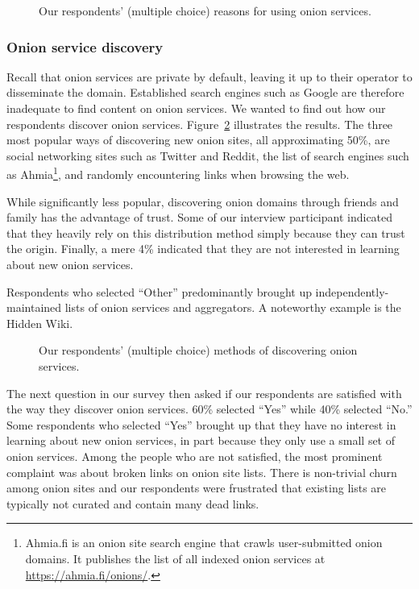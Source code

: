 \begin{figure}[t]
    \centering
    
    \caption{Our respondents' (multiple choice) reasons for using onion
    services.}
    \label{fig:onion-usage}
\end{figure}

\subsubsection{Onion service discovery}

Recall that onion services are private by default, leaving it up to their
operator to disseminate the domain.  Established search engines such as Google
are therefore inadequate to find content on onion services.  We wanted to find
out how our respondents discover onion services.
Figure~\ref{fig:onion-discovery} illustrates the results.  The three most
popular ways of discovering new onion sites, all approximating 50\%, are social
networking sites such as Twitter and Reddit, the list of search engines such as
Ahmia\footnote{Ahmia.fi is an onion site search engine that crawls
user-submitted onion domains.  It publishes the list of all indexed onion
services at \url{https://ahmia.fi/onions/}.}, and randomly encountering links
when browsing the web.

While significantly less popular, discovering onion domains through friends and
family has the advantage of trust.  Some of our interview participant indicated
that they heavily rely on this distribution method simply because they can trust
the origin.  Finally, a mere 4\% indicated that they are not interested in
learning about new onion services.

Respondents who selected ``Other'' predominantly brought up
independently-maintained lists of onion services and aggregators.  A noteworthy
example is the Hidden Wiki.

\begin{figure}[t]
    \centering
    
    \caption{Our respondents' (multiple choice) methods of discovering onion
    services.}
    \label{fig:onion-discovery}
\end{figure}

The next question in our survey then asked if our respondents are satisfied with
the way they discover onion services.  60\% selected ``Yes'' while 40\% selected
``No.'' Some respondents who selected ``Yes'' brought up that they have no
interest in learning about new onion services, in part because they only use a
small set of onion services.  Among the people who are not satisfied, the most
prominent complaint was about broken links on onion site lists.  There is
non-trivial churn among onion sites and our respondents were frustrated that
existing lists are typically not curated and contain many dead links.

